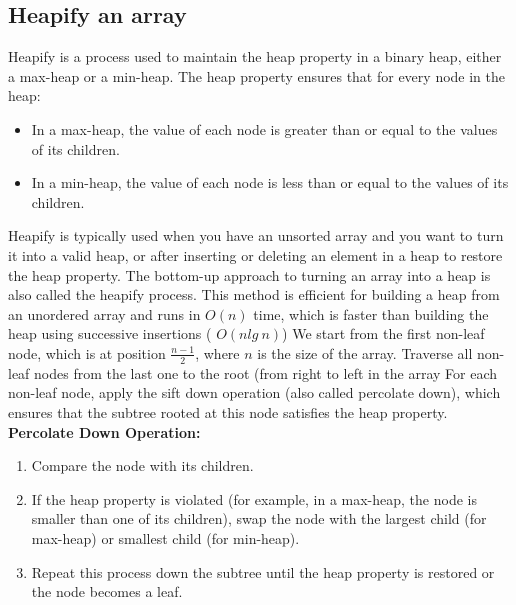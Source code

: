 \documentclass{report}
\begin{document}
\subsection{Heapify an array}
\bigbreak \noindent 
Heapify is a process used to maintain the heap property in a binary heap, either a max-heap or a min-heap. The heap property ensures that for every node in the heap:
\begin{itemize}
    \item In a max-heap, the value of each node is greater than or equal to the values of its children.
    \item In a min-heap, the value of each node is less than or equal to the values of its children.
\end{itemize}
\bigbreak \noindent 
Heapify is typically used when you have an unsorted array and you want to turn it into a valid heap, or after inserting or deleting an element in a heap to restore the heap property.
\bigbreak \noindent 
The bottom-up approach to turning an array into a heap is also called the heapify process. This method is efficient for building a heap from an unordered array and runs in $O(n)$ time, which is faster than building the heap using successive insertions ( $O(nlg \ n)$)
\bigbreak \noindent 
We start from the first non-leaf node, which is at position $\frac{n-1}{2}$, where $n$ is the size of the array.
\bigbreak \noindent 
Traverse all non-leaf nodes from the last one to the root (from right to left in the array
\bigbreak \noindent 
For each non-leaf node, apply the sift down operation (also called percolate down), which ensures that the subtree rooted at this node satisfies the heap property.
\bigbreak \noindent 
\textbf{Percolate Down Operation:}
\begin{enumerate}
    \item Compare the node with its children.
    \item If the heap property is violated (for example, in a max-heap, the node is smaller than one of its children), swap the node with the largest child (for max-heap) or smallest child (for min-heap).
    \item Repeat this process down the subtree until the heap property is restored or the node becomes a leaf.
\end{enumerate}

\pagebreak 
\end{document}
